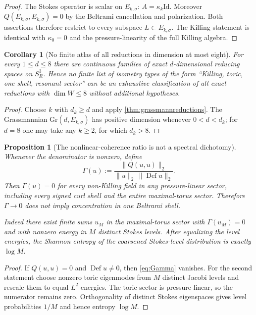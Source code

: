 \documentclass[
 aps,
 prd,
 reprint,
 amsmath,
 amssymb,
 nofootinbib,
 superscriptaddress
]{revtex4-2}
\newtheorem{proposition}[theorem]{Proposition}
\newtheorem{corollary}[theorem]{Corollary}
\theoremstyle{definition}
\theoremstyle{remark}
\newcommand{\Sthree}{S^3_R}
\newcommand{\Def}{\operatorname{Def}}
\newcommand{\Id}{\mathrm{Id}}
\begin{document}
\begin{proof}
The Stokes operator is scalar on $E_{k,\sigma}$:
$A=\kappa_k\Id$.  Moreover
$Q(E_{k,\sigma},E_{k,\sigma})=0$ by the Beltrami cancellation and
polarization.  Both assertions therefore restrict to every subspace
$L\subset E_{k,\sigma}$.  The Killing statement is identical with
$\kappa_0=0$ and the pressure-linearity of the full Killing algebra.
\end{proof}

\begin{corollary}[No finite atlas of all reductions in dimension at most eight]
\label{cor:nosmallatlas}
For every $1\le d\le8$ there are continuous families of exact
$d$-dimensional reducing spaces on $\Sthree$.  Hence no finite list of
isometry types of the form ``Killing, toric, one shell, resonant sector''
can be an exhaustive classification of all exact reductions with
$\dim W\le8$ without additional hypotheses.
\end{corollary}

\begin{proof}
Choose $k$ with $d_k\ge d$ and apply
\cref{thm:grassmannreductions}.  The Grassmannian
$\mathrm{Gr}(d,E_{k,\sigma})$ has positive dimension whenever
$0<d<d_k$; for $d=8$ one may take any $k\ge2$, for which $d_k>8$.
\end{proof}

\begin{proposition}[The nonlinear-coherence ratio is not a spectral dichotomy]
\label{prop:gammalimitation}
Whenever the denominator is nonzero, define
\begin{equation}
 \Gamma(u)
 :=
 \frac{\|Q(u,u)\|_2}
 {\|u\|_2\,\|\Def u\|_2}.
 \label{eq:Gamma}
\end{equation}
Then $\Gamma(u)=0$ for every non-Killing field in any pressure-linear sector,
including every signed curl shell and the entire maximal-torus sector.
Therefore $\Gamma\to0$ does not imply concentration in one Beltrami shell.

Indeed there exist finite sums $u_M$ in the maximal-torus sector with
$\Gamma(u_M)=0$ and with nonzero energy in $M$ distinct Stokes levels.
After equalizing the level energies, the Shannon entropy of the coarsened
Stokes-level distribution is exactly $\log M$.
\end{proposition}

\begin{proof}
If $Q(u,u)=0$ and $\Def u\ne0$, then \eqref{eq:Gamma} vanishes.
For the second statement choose nonzero toric eigenmodes from $M$ distinct
Jacobi levels and rescale them to equal $L^2$ energies.  The toric sector is
pressure-linear, so the numerator remains zero.  Orthogonality of distinct
Stokes eigenspaces gives level probabilities $1/M$ and hence entropy
$\log M$.
\end{proof}
\end{document}
